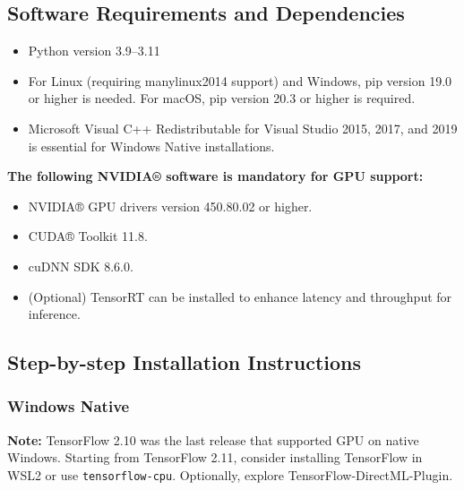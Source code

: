 \subsection{Software Requirements and Dependencies}

\begin{itemize}
	\item Python version 3.9--3.11
	\item For Linux (requiring manylinux2014 support) and Windows, pip version 19.0 or higher is needed. For macOS, pip version 20.3 or higher is required.
	\item Microsoft Visual C++ Redistributable for Visual Studio 2015, 2017, and 2019 is essential for Windows Native installations.
\end{itemize}

\textbf{The following NVIDIA® software is mandatory for GPU support:}

\begin{itemize}
	\item NVIDIA® GPU drivers version 450.80.02 or higher.
	\item CUDA® Toolkit 11.8.
	\item cuDNN SDK 8.6.0.
	\item (Optional) TensorRT can be installed to enhance latency and throughput for inference.
\end{itemize}

\subsection{Step-by-step Installation Instructions}

\subsubsection{Windows Native}

\textbf{Note:} TensorFlow 2.10 was the last release that supported GPU on native Windows. Starting from TensorFlow 2.11, consider installing TensorFlow in WSL2 or use \texttt{tensorflow-cpu}. Optionally, explore TensorFlow-DirectML-Plugin.

